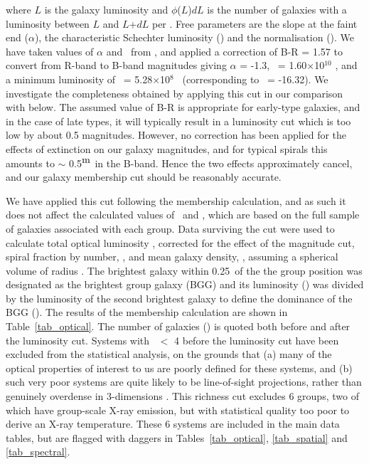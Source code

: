 \documentclass[usenatbib]{mn2e}
\begin{document}
\noindent  where $L$ is the galaxy luminosity and $\phi$($L$)$dL$ is the number of
galaxies with a luminosity between $L$ and $L$+$dL$ per \Mpccu.  Free parameters are
the slope at the faint end ($\alpha$), the characteristic Schechter luminosity
(\Lstar) and the normalisation (\phistar).  We have taken values of $\alpha$ and
\Lstar\ from \citet{zabludoff00}, and applied a correction of B-R = 1.57 to
convert from R-band to B-band magnitudes \citep*{fukugita95} giving $\alpha$ =
-1.3, \Lstar\ = 1.60$\times$10$^{10}$ \Lsol, and a minimum luminosity of \Lcut\ =
5.28$\times$10$^{8}$ \Lsol\ (corresponding to \MB\ = -16.32).  We investigate the
completeness obtained by applying this cut in our comparison with \citet{miles04}
below.  The assumed value of B-R is appropriate for early-type
galaxies, and in the case of late types, it will typically result in a luminosity
cut which is too low by about 0.5 magnitudes.  However, no correction has been
applied for the effects of extinction on our galaxy magnitudes, and for typical
spirals this amounts to $\sim$ 0.5$^{\mbox{m}}$ in the B-band. Hence the two effects
approximately cancel, and our galaxy membership cut should be reasonably
accurate.

We have applied this cut following the membership calculation, and as such it 
does not affect the calculated values of \vel\ and \sigmav, which are based on
the full sample of galaxies associated with each group.  Data surviving the cut
were used to calculate total optical luminosity \LB, corrected for the effect of the
magnitude cut, spiral fraction by number, \fsp, and mean galaxy density, \dengal,
assuming a spherical volume of radius \rfh.  The brightest galaxy within 0.25\rfh\
of the the group
position was designated as the brightest group galaxy (BGG) and its luminosity
(\LBGG) was divided by the luminosity of the second brightest galaxy to define
the dominance of the BGG (\dom).  The results of the membership calculation are
shown in Table~\ref{tab_optical}.  The number of galaxies (\Ngal) is quoted both
before and after the luminosity cut. Systems with \Ngal\ $<$ 4 before the
luminosity cut have been excluded from the statistical analysis, on the grounds
that (a) many of the optical properties of interest to us are poorly defined for
these systems, and (b) such very poor systems are quite likely to be line-of-sight
projections, rather than genuinely overdense in 3-dimensions \citep{frederic95a}.
This richness cut excludes 6 groups, two of which have group-scale X-ray
emission, but with statistical quality too poor to derive an X-ray temperature.
These 6 systems are included in the main data tables, but are flagged with
daggers in Tables~\ref{tab_optical}, \ref{tab_spatial} and \ref{tab_spectral}.
\end{document}

